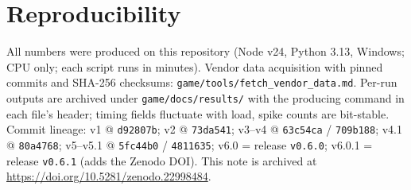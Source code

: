 \documentclass[11pt,a4paper]{article}
\newcommand{\ds}[1]{\textcolor{linkblue}{\url{#1}}}
\begin{document}
\section{Reproducibility}

\begin{sloppypar}
All numbers were produced on this repository (Node v24, Python 3.13, Windows;
CPU only; each script runs in minutes). Vendor data acquisition with pinned
commits and SHA-256 checksums: \texttt{game/tools/fetch\_vendor\_data.md}.
Per-run outputs are archived under \texttt{game/docs/results/} with the
producing command in each file's header; timing fields fluctuate with load,
spike counts are bit-stable. Commit lineage: v1 @ \texttt{d92807b}; v2 @
\texttt{73da541}; v3--v4 @ \texttt{63c54ca} / \texttt{709b188}; v4.1 @
\texttt{80a4768}; v5--v5.1 @ \texttt{5fc44b0} / \texttt{4811635}; v6.0 =
release \texttt{v0.6.0}; v6.0.1 = release \texttt{v0.6.1} (adds the Zenodo
DOI). This note is archived at \ds{https://doi.org/10.5281/zenodo.22998484}.
\end{sloppypar}
\end{document}
